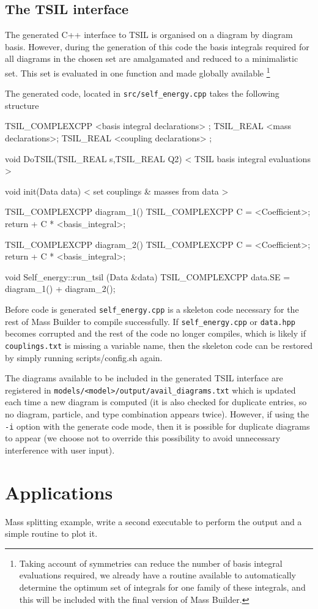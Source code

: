 \subsection{The TSIL interface}

The generated C++ interface to TSIL is organised on a diagram by diagram basis.  However, during the generation of this code the basis integrals required for all diagrams in the chosen set are amalgamated and reduced to a minimalistic set.  This set is evaluated in one function and made globally available \footnote{Taking account of symmetries can reduce the number of basis integral evaluations required, we already have a routine available to automatically determine the optimum set of integrals for one family of these integrals, and this will be included with the final version of Mass Builder.}

The generated code, located in \lstinline{src/self_energy.cpp} takes the following structure
\begin{lstcpp}
TSIL_COMPLEXCPP  <basis integral declarations> ;
TSIL_REAL  <mass declarations>;
TSIL_REAL  <coupling declarations> ;

void DoTSIL(TSIL_REAL s,TSIL_REAL Q2)
{
< TSIL basis integral evaluations >
}

void init(Data data) 
{
< set couplings & masses from data >
}

TSIL_COMPLEXCPP  diagram_1()
{
TSIL_COMPLEXCPP C =  <Coefficient>;
return  + C * <basis_integral>;
}

TSIL_COMPLEXCPP  diagram_2()
{
TSIL_COMPLEXCPP C =  <Coefficient>;
return  + C * <basis_integral>;
}

void Self_energy::run_tsil (Data &data) 
{
TSIL_COMPLEXCPP data.SE = diagram_1() + diagram_2();
}
\end{lstcpp}

Before code is generated \lstinline{self_energy.cpp} is a skeleton code necessary for the rest of Mass Builder to compile successfully.  If \lstinline{self_energy.cpp} or \lstinline{data.hpp} becomes corrupted and the rest of the code no longer compiles, which is likely if \lstinline{couplings.txt} is missing a variable name, then the skeleton code can be restored by simply running scripts/config.sh again.

The diagrams available to be included in the generated TSIL interface are registered in \lstinline{models/<model>/output/avail_diagrams.txt} which is updated each time a new diagram is computed (it is also checked for duplicate entries, so no diagram, particle, and type combination appears twice).  However, if using the \lstinline{-i} option with the generate code mode, then it is possible for duplicate diagrams to appear (we choose not to override this possibility to avoid unnecessary interference with user input).



\section{Applications}

Mass splitting example, write a second executable to perform the output and a simple routine to plot it.




{}


  